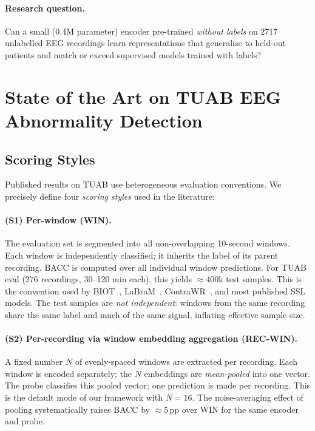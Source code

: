 \documentclass[11pt,a4paper]{article}
\begin{document}
\paragraph{Research question.}
Can a small (0.4M parameter) encoder pre-trained \emph{without labels} on 2717
unlabelled EEG recordings learn representations that generalise to held-out
patients and match or exceed supervised models trained with labels?

\section{State of the Art on TUAB EEG Abnormality Detection}
\label{sec:sota}

\subsection{Scoring Styles}
\label{sec:scoring}

Published results on TUAB use heterogeneous evaluation conventions.
We precisely define four \emph{scoring styles} used in the literature:

\paragraph{(S1) Per-window (WIN).}
The evaluation set is segmented into all non-overlapping 10-second windows.
Each window is independently classified; it inherits the label of its parent
recording.  BACC is computed over all individual window predictions.
For TUAB eval (276 recordings, 30--120 min each), this yields ${\approx}400$k
test samples.
This is the convention used by BIOT~\cite{biot}, LaBraM~\cite{labram},
ContraWR~\cite{contrawr}, and most published SSL models.  The test samples
are \emph{not independent}: windows from the same recording share the same
label and much of the same signal, inflating effective sample size.

\paragraph{(S2) Per-recording via window embedding aggregation (REC-WIN).}
A fixed number $N$ of evenly-spaced windows are extracted per recording.
Each window is encoded separately; the $N$ embeddings are \emph{mean-pooled}
into one vector.  The probe classifies this pooled vector; one prediction
is made per recording.  This is the default mode of our framework with $N{=}16$.
The noise-averaging effect of pooling systematically raises BACC by ${\approx}5$\,pp
over WIN for the same encoder and probe.
\end{document}

